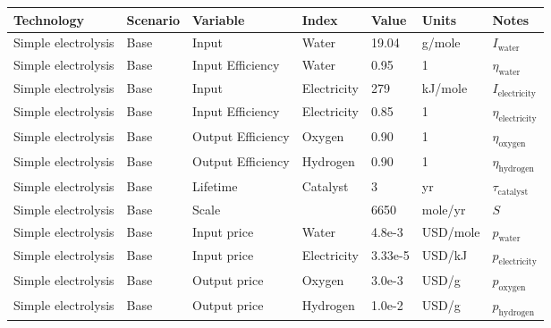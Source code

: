 \documentclass[letterpaper,10pt,english]{sphinxmanual}
\begin{document}
\begin{savenotes}\sphinxattablestart
\centering
{}
\sphinxthecaptionisattop
{}\label{\detokenize{database:table-2}}\label{\detokenize{database:tbl-designs}}
\sphinxaftertopcaption
\begin{tabulary}{\linewidth}[t]{|T|T|T|T|T|T|T|}
\hline
\sphinxstyletheadfamily 
Technology
&\sphinxstyletheadfamily 
Scenario
&\sphinxstyletheadfamily 
Variable
&\sphinxstyletheadfamily 
Index
&\sphinxstyletheadfamily 
Value
&\sphinxstyletheadfamily 
Units
&\sphinxstyletheadfamily 
Notes
\\
\hline
Simple electrolysis
&
Base
&
Input
&
Water
&
19.04
&
g/mole
&
\(I_\mathrm{water}\)
\\
\hline
Simple electrolysis
&
Base
&
Input Efficiency
&
Water
&
0.95
&
1
&
\(\eta_\mathrm{water}\)
\\
\hline
Simple electrolysis
&
Base
&
Input
&
Electricity
&
279
&
kJ/mole
&
\(I_\mathrm{electricity}\)
\\
\hline
Simple electrolysis
&
Base
&
Input Efficiency
&
Electricity
&
0.85
&
1
&
\(\eta_\mathrm{electricity}\)
\\
\hline
Simple electrolysis
&
Base
&
Output Efficiency
&
Oxygen
&
0.90
&
1
&
\(\eta_\mathrm{oxygen}\)
\\
\hline
Simple electrolysis
&
Base
&
Output Efficiency
&
Hydrogen
&
0.90
&
1
&
\(\eta_\mathrm{hydrogen}\)
\\
\hline
Simple electrolysis
&
Base
&
Lifetime
&
Catalyst
&
3
&
yr
&
\(\tau_\mathrm{catalyst}\)
\\
\hline
Simple electrolysis
&
Base
&
Scale
&&
6650
&
mole/yr
&
\(S\)
\\
\hline
Simple electrolysis
&
Base
&
Input price
&
Water
&
4.8e-3
&
USD/mole
&
\(p_\mathrm{water}\)
\\
\hline
Simple electrolysis
&
Base
&
Input price
&
Electricity
&
3.33e-5
&
USD/kJ
&
\(p_\mathrm{electricity}\)
\\
\hline
Simple electrolysis
&
Base
&
Output price
&
Oxygen
&
3.0e-3
&
USD/g
&
\(p_\mathrm{oxygen}\)
\\
\hline
Simple electrolysis
&
Base
&
Output price
&
Hydrogen
&
1.0e-2
&
USD/g
&
\(p_\mathrm{hydrogen}\)
\\
\hline
\end{tabulary}
\par
\sphinxattableend\end{savenotes}
\end{document}
